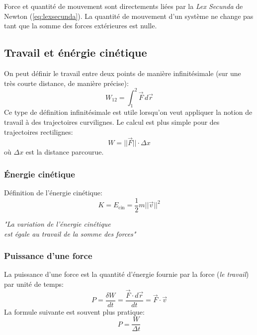 \documentclass{article}
\numberwithin{equation}{section}
\begin{document}
Force et quantité de mouvement sont directements liées par la \emph{Lex Secunda} de Newton (\ref{eq:lexsecunda}). La quantité de mouvement d'un système ne change pas tant que la somme des forces extérieures est nulle.

\subsection{Travail et énérgie cinétique}

On peut définir le travail entre deux points de manière infinitésimale (sur une très courte distance, de manière précise):
\begin{equation}
	\boxed{ W_{12} = \int_1^2 \vec F \, d \vec r }
\end{equation}
Ce type de définition infinitésimale est utile lorsqu'on veut appliquer la notion de travail à des trajectoires curvilignes. Le calcul est plus simple pour des trajectoires rectilignes:
\begin{equation}
	\boxed{ W = ||\vec F|| \cdot \Delta x }
\end{equation}
où \(\Delta x\) est la distance parcourue.

\subsubsection{Énergie cinétique}
Définition de l'énergie cinétique:
\begin{equation}
	\boxed{ K = E_\text{cin} = \frac{1}{2} m ||\vec v||^2 }
\end{equation}

\begin{center}
	\emph{"La variation de l'énergie cinétique \\ est égale au travail de la somme des forces"}
\end{center}


\subsubsection{Puissance d'une force}
La puissance d'une force est la quantité d'énergie fournie par la force (\emph{le travail}) par unité de temps:
\begin{equation}
	\boxed{ P = \frac{\delta W}{dt} = \frac{\vec F \cdot d \vec r}{dt} = \vec F \cdot \vec v }
\end{equation}
La formule suivante est souvent plus pratique:
\begin{equation}
	\boxed{ P = \dfrac{W}{\Delta t} }
\end{equation}
\end{document}
